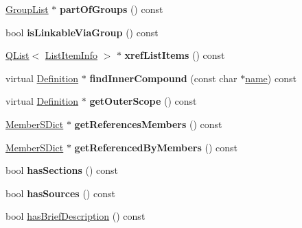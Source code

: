 \begin{DoxyCompactItemize}
\mbox{\hyperlink{class_group_list}{Group\+List}} $\ast$ {\bfseries part\+Of\+Groups} () const
\item 
\mbox{\label{class_definition_adae0a82b2bd814c0a0fb0f9f98b6ccf6}} 
bool {\bfseries is\+Linkable\+Via\+Group} () const
\item 
\mbox{\label{class_definition_a1fa089fda1217c0761cfe4d3eea5998e}} 
\mbox{\hyperlink{class_q_list}{Q\+List}}$<$ \mbox{\hyperlink{struct_list_item_info}{List\+Item\+Info}} $>$ $\ast$ {\bfseries xref\+List\+Items} () const
\item 
\mbox{\label{class_definition_aba76f799ba7442f517dbc660ccb249b7}} 
virtual \mbox{\hyperlink{class_definition}{Definition}} $\ast$ {\bfseries find\+Inner\+Compound} (const char $\ast$\mbox{\hyperlink{class_definition_a9324000f785d7b6b098878a3bca4df5b}{name}}) const
\item 
\mbox{\label{class_definition_a4a42ce8e8098b06709a4de372a61e8da}} 
virtual \mbox{\hyperlink{class_definition}{Definition}} $\ast$ {\bfseries get\+Outer\+Scope} () const
\item 
\mbox{\label{class_definition_a5e140ad71c529318d4e43c5b4cb7f5fd}} 
\mbox{\hyperlink{class_member_s_dict}{Member\+S\+Dict}} $\ast$ {\bfseries get\+References\+Members} () const
\item 
\mbox{\label{class_definition_a51bb250cf881130f51b1dfdc30137e85}} 
\mbox{\hyperlink{class_member_s_dict}{Member\+S\+Dict}} $\ast$ {\bfseries get\+Referenced\+By\+Members} () const
\item 
\mbox{\label{class_definition_a7a19d0634ef60b73213fdbec5609d160}} 
bool {\bfseries has\+Sections} () const
\item 
\mbox{\label{class_definition_a5f50feb9bc3bc8fec8bce320187e904a}} 
bool {\bfseries has\+Sources} () const
\item 
bool \mbox{\hyperlink{class_definition_a1a4519f06f38904ab1914ecd641c4a36}{has\+Brief\+Description}} () const
\item 
\mbox{\label{class_definition_acb87b91a8bcb9fdba435ac4e1eec8fca}} 

\end{DoxyCompactItemize}
